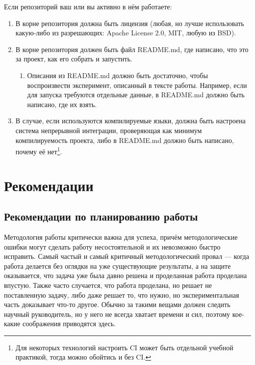 \documentclass{article}
\begin{document}
Если репозиторий ваш или вы активно в нём работаете:

\begin{enumerate}
    \item В корне репозитория должна быть лицензия (любая, но лучше использовать какую-либо из разрешающих: Apache License 2.0, MIT, любую из BSD).
    \item В корне репозитория должен быть файл README.md, где написано, что это за проект, как его собрать и запустить.
    \begin{enumerate}
        \item Описания из README.md должно быть достаточно, чтобы воспроизвести эксперимент, описанный в тексте работы. Например, если для запуска требуются отдельные данные, в README.md должно быть написано, где их взять.
    \end{enumerate}
    \item В случае, если используются компилируемые языки, должна быть настроена система непрерывной интеграции, проверяющая как минимум компилируемость проекта, либо в README.md должно быть написано, почему её нет\footnote{Для некоторых технологий настроить CI может быть отдельной учебной практикой, тогда можно обойтись и без CI.}.
\end{enumerate}

\section{Рекомендации}

\subsection{Рекомендации по планированию работы}

Методология работы критически важна для успеха, причём методологические ошибки могут сделать работу несостоятельной и их невозможно быстро исправить. Самый частый и самый критичный методологический провал --- когда работа делается без оглядки на уже существующие результаты, а на защите оказывается, что задача уже была давно решена и проделанная работа проделана впустую. Также часто случается, что работа проделана, но решает не поставленную задачу, либо даже решает то, что нужно, но экспериментальная часть доказывает что-то другое. Обычно за такими вещами должен следить научный руководитель, но у него не всегда хватает времени и сил, поэтому кое-какие соображения приводятся здесь.
\end{document}
